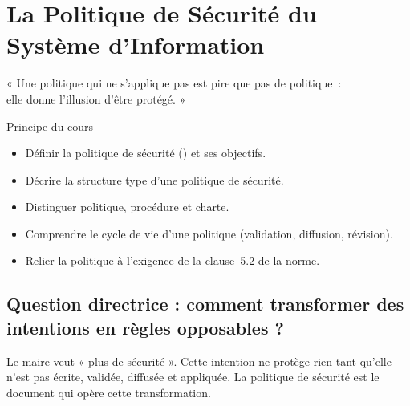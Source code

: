 
\chapter{La Politique de Sécurité du Système d'Information}
\label{chap:politique}

\epigraph{%
    « Une politique qui ne s'applique pas est pire que pas de politique~:\\
    elle donne l'illusion d'être protégé. »%
}{Principe du cours}


\begin{boxobjectifs}
\begin{itemize}
    \item Définir la politique de sécurité () et ses objectifs.
    \item Décrire la structure type d'une politique de sécurité.
    \item Distinguer politique, procédure et charte.
    \item Comprendre le cycle de vie d'une politique (validation, diffusion,
          révision).
    \item Relier la politique à l'exigence de la clause~5.2 de la norme.
\end{itemize}
\end{boxobjectifs}

\bigskip

\section*{Question directrice : comment transformer des intentions en règles opposables ?}

Le maire veut « plus de sécurité ». Cette intention ne protège rien tant
qu'elle n'est pas écrite, validée, diffusée et appliquée. La politique de
sécurité est le document qui opère cette transformation.

